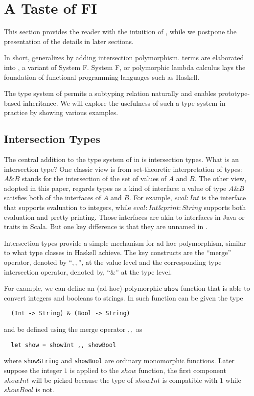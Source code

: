 \section{A Taste of FI}

This section provides the reader with the intuition of \FIend, while we postpone
the presentation of the details in later sections.

In short, \FI generalizes \Fend by adding intersection polymorphism. \FI terms
are elaborated into \Fend, a variant of System F. System F, or polymorphic
lambda calculus lays the foundation of functional programming languages such as
Haskell.

The type system of \FI permits a subtyping relation naturally and enables
prototype-based inheritance. We will explore the usefulness of such a type
system in practice by showing various examples.

\subsection{Intersection Types}

The central addition to the type system of \F in \FI is intersection types. What
is an intersection type? One classic view is from set-theoretic interpretation
of types: $ A \& B $ stands for the intersection of the set of values of $ A $
and $ B $. The other view, adopted in this paper, regards types as a kind of
interface: a value of type $ A \& B $ satisfies both of the interfaces of $ A $
and $ B $. For example, $ { eval : Int } $ is the interface that supports
evaluation to integers, while $ { eval : Int } \& { print : String } $ supports
both evaluation and pretty printing. Those interfaces are akin to interfaces in
Java or traits in Scala. But one key difference is that they are unnamed in
\FIend.

Intersection types provide a simple mechanism for ad-hoc polymorphism, similar
to what type classes in Haskell achieve. The key constructs are the ``merge''
operator, denoted by ``$ ,, $'', at the value level and the corresponding type
intersection operator, denoted by, ``$ \& $'' at the type level.

For example, we can define an (ad-hoc)-polymorphic $ \texttt{show} $ function
that is able to convert integers and booleans to strings. In \FI such function
can be given the type
\begin{lstlisting}
  (Int -> String) & (Bool -> String)
\end{lstlisting}
and be defined using the merge operator $ ,, $ as
\begin{lstlisting}
  let show = showInt ,, showBool
\end{lstlisting}
where \texttt{showString} and \texttt{showBool} are ordinary monomorphic
functions. Later suppose the integer $ 1 $ is applied to the $ show $ function,
the first component $ showInt $ will be picked because the type of $ showInt $
is compatible with $ 1 $ while $ showBool $ is not.


